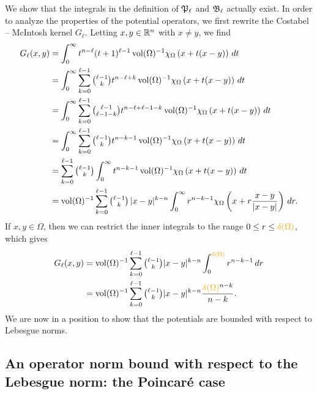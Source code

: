 \documentclass[10pt,letterpaper]{article}
\newcommand\cye[1]{%
  \protect\leavevmode
  \begingroup
    \color{red!35!yellow}%
    #1%
  \endgroup
}
\begin{document}
We show that the integrals in the definition of ${\mathfrak P}_{\ell}$ and ${\mathfrak B}_{\ell}$ actually exist. 
In order to analyze the properties of the potential operators,
we first rewrite the Costabel\cye{--}McIntosh kernel $G_{\ell}$.
Letting $x,y \in {\mathbb R}^n$ with $x \neq y$, we find 
\begin{align*}
    G_{\ell}(x,y) 
    &= 
    \int_{0}^{\infty} t^{n-\ell} (t+1)^{\ell-1} \operatorname{vol}(\Omega)^{-1} \chi_{\Omega} \left( x+t(x-y) \right)\,dt
    \\
    &= 
    \int_{0}^{\infty} \sum_{k=0}^{\ell-1} \tbinom{\ell-1}{k} t^{n-\ell+k} \operatorname{vol}(\Omega)^{-1} \chi_{\Omega} \left( x+t(x-y) \right)\,dt
    \\
    &= 
    \int_{0}^{\infty} \sum_{k=0}^{\ell-1} \tbinom{\ell-1}{\ell-1-k} t^{n-\ell+\ell-1-k} \operatorname{vol}(\Omega)^{-1} \chi_{\Omega} \left( x+t(x-y) \right)\,dt
    \\
    &= 
    \int_{0}^{\infty} \sum_{k=0}^{\ell-1} \tbinom{\ell-1}{k} t^{n-k-1} \operatorname{vol}(\Omega)^{-1} \chi_{\Omega} \left( x+t(x-y) \right)\,dt
    \\
    &= 
    \sum_{k=0}^{\ell-1} \tbinom{\ell-1}{k} \int_{0}^{\infty} t^{n-k-1} \operatorname{vol}(\Omega)^{-1} \chi_{\Omega}\left( x+t(x-y) \right)\,dt 
    \\
    &= 
    \operatorname{vol}(\Omega)^{-1} \sum_{k=0}^{\ell-1} \tbinom{\ell-1}{k} \, |x-y|^{k-n} \int_{0}^{\infty} r^{n-k-1} \chi_{\Omega}\left(x+r\frac{x-y}{|x-y|}\right)\,dr
    .
\end{align*}
If $x, y \in \Omega$, then we can restrict the inner integrals to the range $0 \leq r \leq \cye{\diam(\Omega)}$, which gives 
\begin{align*}
    G_{\ell}(x,y) 
    &= 
    \vol(\Omega)^{-1} \sum_{k=0}^{\ell-1}\tbinom{\ell-1}{k} |x-y|^{k-n} \int_{0}^{\cye{\diam(\Omega)}} r^{n-k-1} \,dr 
    \\
    &= 
    \vol(\Omega)^{-1} \sum_{k=0}^{\ell-1}\tbinom{\ell-1}{k} |x-y|^{k-n} \frac{ \cye{\diam(\Omega)}^{n-k} }{n-k}.
\end{align*}
We are now in a position to show that the potentials are bounded with respect to Lebesgue norms. 

\subsection{\cye{An operator norm bound with respect to the Lebesgue norm: the Poincar\'e case}}
\end{document}
